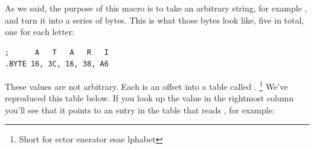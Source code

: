 As we said, the purpose of this macro is to take an arbitrary string, for example ,
and turn it into a series of bytes. This is what those bytes look like, five in total, one for
each letter:

\begin{lstlisting}
;      A   T   A   R   I
.BYTE 16, 3C, 16, 38, A6
\end{lstlisting}

These values are not arbitrary. Each is an offset into a table called .
\footnote{Short for ector enerator esae lphabet}
We've reproduced this table below. If you look up the value  in the rightmost column
you'll see that
it points to an entry in the table that reads , for example:

